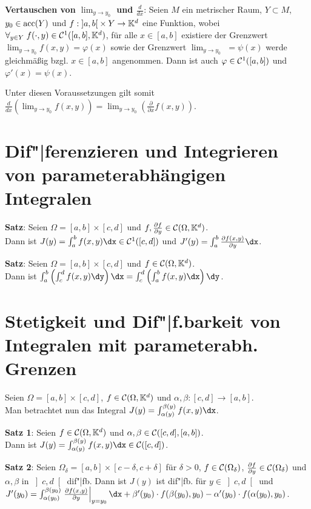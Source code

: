 \textbf{Vertauschen von $\lim_{y \to y_0}$ und $\frac{d}{dx}$}:
Seien $M$ ein metrischer Raum, $Y \subset M$, $y_0 \in \operatorname{acc}(Y)$ und
$f: \left]a,b\right[ \times Y \rightarrow \mathbb{K}^d$ eine Funktion, wobei
$\forall_{y \in Y}\; f(\cdot, y) \in \mathcal{C}^1([a,b], \mathbb{K}^d)$,
für alle $x \in [a,b]$ existiere der Grenzwert
$\lim_{y \to y_0} f(x,y) = \varphi(x)$ sowie der Grenzwert
$\lim_{y \to y_0}$  $= \psi(x)$
werde gleichmäßig bzgl. $x \in [a,b]$ angenommen.
Dann ist auch $\varphi \in \mathcal{C}^1([a,b])$ und $\varphi'(x) = \psi(x)$.

Unter diesen Voraussetzungen gilt somit
$\frac{d}{dx} \left(\lim_{y \to y_0} f(x,y)\right) =
\lim_{y \to y_0} \left(\frac{\partial}{\partial x} f(x,y)\right)$.


\section{%
    Dif"|ferenzieren und Integrieren von parameterabhängigen Integralen%
}

\textbf{Satz}:
Seien $\Omega = [a,b] \times [c,d]$
und $f, \frac{\partial f}{\partial y} \in \mathcal{C}(\Omega, \mathbb{K}^d)$. \\
Dann ist $J(y) = \int_a^b f(x,y)\dx \in \C^1([c,d])$
und $J'(y) = \int_a^b \frac{\partial f(x,y)}{\partial y} \dx$.

\textbf{Satz}: Seien $\Omega = [a,b] \times [c,d]$ und
$f \in \mathcal{C}(\Omega, \mathbb{K}^d)$. \\
Dann ist $\int_a^b \left(\int_c^d f(x,y)\dy\right)\dx
= \int_c^d \left(\int_a^b f(x,y)\dx\right)\dy$.

\section{%
    Stetigkeit und Dif"|f.barkeit von Integralen mit parameterabh.
    Grenzen%
}

Seien $\Omega = [a,b] \times [c,d]$, $f \in \mathcal{C}(\Omega, \mathbb{K}^d)$
und $\alpha, \beta: [c,d] \rightarrow [a,b]$. \\
Man betrachtet nun das Integral $J(y) = \int_{\alpha(y)}^{\beta(y)} f(x,y)\dx$.

\textbf{Satz 1}: Seien $f \in \mathcal{C}(\Omega, \mathbb{K}^d)$ und
$\alpha, \beta \in \mathcal{C}([c,d], [a,b])$. \\
Dann ist $J(y) = \int_{\alpha(y)}^{\beta(y)} f(x,y)\dx \in \C([c,d])$.

\textbf{Satz 2}: Seien $\Omega_\delta = [a,b] \times [c - \delta, c + \delta]$
für $\delta > 0$, $f \in \mathcal{C}(\Omega_\delta)$,
$\frac{\partial f}{\partial y} \in \mathcal{C}(\Omega_\delta)$
und $\alpha, \beta$ in $\left]c,d\right[$ dif"|fb.
Dann ist $J(y)$ ist dif"|fb. für $y \in \left]c,d\right[$ und \\
$J'(y_0) = \int_{\alpha(y_0)}^{\beta(y_0)}
\left.\frac{\partial f(x, y)}{\partial y}\right|_{y = y_0}\dx +
\beta'(y_0) \cdot f(\beta(y_0), y_0) - \alpha'(y_0) \cdot f(\alpha(y_0), y_0)$.

